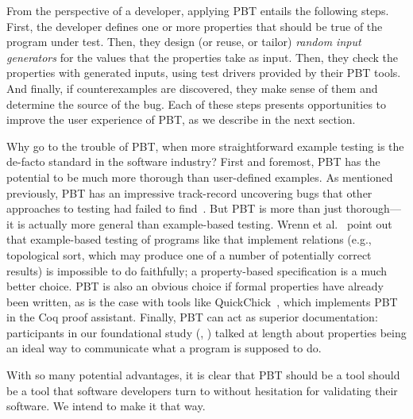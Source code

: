 From the perspective of a developer, applying PBT entails the following
steps. First, the developer defines one or more properties that should be true
of the program under test. Then, they design (or reuse, or tailor) {\em random
input generators} for the values that the properties take as input. Then, they
check the properties with generated inputs, using test drivers provided by their
PBT tools. And finally, if counterexamples are discovered, they make sense of
them and determine the source of the bug.
Each of these steps presents opportunities to improve the user experience of
PBT, as we describe in the next section.

\smallskip

Why go to the trouble of PBT, when more straightforward example testing is the
de-facto standard in the software industry? First and foremost, PBT has the
potential to be much more thorough than user-defined examples. As mentioned
previously, PBT has an impressive track-record uncovering bugs that other
approaches to testing had failed to find~\cite{arts2006testing,
hughes2014mysteries, Bornholt2021, arts2015testing, hughes2016experiences}. But
PBT is more than just thorough---it is actually more general than example-based
testing. Wrenn et al.~\cite{wrenn2021using} point out that example-based testing
of programs like that implement relations (e.g., topological sort, which may
produce one of a number of potentially correct results) is impossible to do
faithfully; a property-based specification is a much better choice. PBT is also
an obvious choice if formal properties have already been written, as is the case
with tools like QuickChick~\cite{paraskevopoulou_foundational_2015}, which
implements PBT in
the Coq proof assistant. Finally, PBT can act as superior documentation:
participants in our foundational study (, )
talked at length about properties being an ideal way to communicate what a
program is supposed to do.

With so many potential advantages, it is clear that PBT should be a tool should
be a tool that software developers turn to without hesitation for validating
their software. We intend to make it that way.

\iflater{}
  \fi


